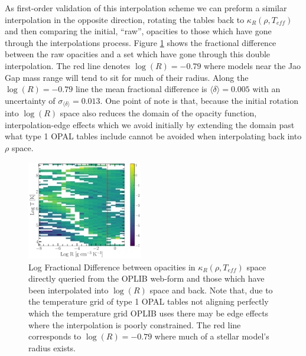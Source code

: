 As first-order validation of this interpolation scheme we can preform a similar
interpolation in the opposite direction, rotating the tables back to
$\kappa_{R}(\rho, T_{eff})$ and then comparing the initial, ``raw'', opacities
to those which have gone through the interpolations process. Figure
\ref{fig:fracdiff} shows the fractional difference between the raw opacities
and a set which have gone through this double interpolation. The red line
denotes $\log(R)=-0.79$ where models near the Jao Gap mass range will
tend to sit for much of their radius. Along the $\log(R)=-0.79$ line the mean
fractional difference is $\langle \delta \rangle = 0.005$ with an uncertainty of
$\sigma_{\langle\delta\rangle} = 0.013$. One point of note is that, because the
initial rotation into $\log(R)$ space also reduces the domain of the opacity
function, interpolation-edge effects which we avoid initially by extending the
domain past what type 1 OPAL tables include cannot be avoided when
interpolating back into $\rho$ space. 

\begin{figure}
	\centering
	\includegraphics[width=0.45\textwidth]{FractionalDifference.pdf}
	\caption{Log Fractional Difference between opacities in $\kappa_{R}(\rho,
	T_{eff})$ space directly queried from the OPLIB web-form and those which
	have been interpolated into $\log(R)$ space and back. Note that, due to the
	temperature grid of type 1 OPAL tables not aligning perfectly which the temperature
	grid OPLIB uses there may be edge effects where the interpolation is poorly
	constrained. The red line corresponds to $\log(R) = -0.79$ where much of a
	stellar model's radius exists.}
	\label{fig:fracdiff}
\end{figure}

